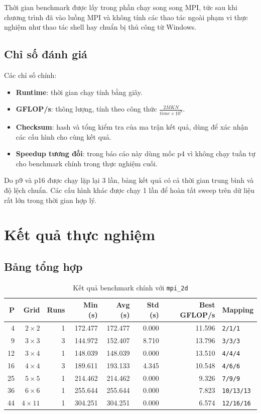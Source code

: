 \documentclass[12pt,a4paper]{article}
\newcommand{\code}[1]{\texttt{#1}}
\begin{document}
Thời gian benchmark được lấy trong phần chạy song song MPI, tức sau khi chương trình đã vào luồng MPI và không tính các thao tác ngoài phạm vi thực nghiệm như thao tác shell hay chuẩn bị thủ công từ Windows.

\subsection{Chỉ số đánh giá}
Các chỉ số chính:
\begin{itemize}
  \item \textbf{Runtime}: thời gian chạy tính bằng giây.
  \item \textbf{GFLOP/s}: thông lượng, tính theo công thức $\frac{2MKN}{time \times 10^9}$.
  \item \textbf{Checksum}: hash và tổng kiểm tra của ma trận kết quả, dùng để xác nhận các cấu hình cho cùng kết quả.
  \item \textbf{Speedup tương đối}: trong báo cáo này dùng mốc p4 vì không chạy tuần tự cho benchmark chính trong thực nghiệm cuối.
\end{itemize}

Do p9 và p16 được chạy lặp lại 3 lần, bảng kết quả có cả thời gian trung bình và độ lệch chuẩn. Các cấu hình khác được chạy 1 lần để hoàn tất sweep trên dữ liệu rất lớn trong thời gian hợp lý.

\section{Kết quả thực nghiệm}
\subsection{Bảng tổng hợp}
\begin{table}[H]
\centering
\caption{Kết quả benchmark chính với \code{mpi\_2d}}
\small
\begin{tabular}{rrrrrrrl}
\toprule
P & Grid & Runs & Min (s) & Avg (s) & Std (s) & Best GFLOP/s & Mapping \\
\midrule
4  & $2\times2$  & 1 & 172.477 & 172.477 & 0.000 & 11.596 & \code{2/1/1} \\
9  & $3\times3$  & 3 & 144.972 & 152.407 & 8.710 & 13.796 & \code{3/3/3} \\
12 & $3\times4$  & 1 & 148.039 & 148.039 & 0.000 & 13.510 & \code{4/4/4} \\
16 & $4\times4$  & 3 & 189.611 & 193.133 & 4.345 & 10.548 & \code{4/6/6} \\
25 & $5\times5$  & 1 & 214.462 & 214.462 & 0.000 & 9.326 & \code{7/9/9} \\
36 & $6\times6$  & 1 & 255.644 & 255.644 & 0.000 & 7.823 & \code{10/13/13} \\
44 & $4\times11$ & 1 & 304.251 & 304.251 & 0.000 & 6.574 & \code{12/16/16} \\
\bottomrule
\end{tabular}
\end{table}
\end{document}
